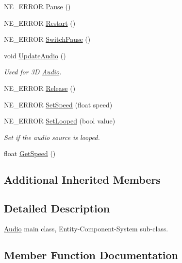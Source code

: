 \begin{DoxyCompactItemize}
N\+E\+\_\+\+E\+R\+R\+OR \mbox{\hyperlink{class_audio_a2f173c788f4c72def6cd0d5d52cb83a4}{Pause}} ()
\item 
N\+E\+\_\+\+E\+R\+R\+OR \mbox{\hyperlink{class_audio_ae2bcb6b054a71006cc8ac03ff62d5d96}{Restart}} ()
\item 
N\+E\+\_\+\+E\+R\+R\+OR \mbox{\hyperlink{class_audio_adf1cb46f65decf2c8101dd0461040953}{Switch\+Pause}} ()
\item 
\mbox{\label{class_audio_a4420fab7cb3ad15089d3f2b3ee74ccf3}} 
void \mbox{\hyperlink{class_audio_a4420fab7cb3ad15089d3f2b3ee74ccf3}{Update\+Audio}} ()
\begin{DoxyCompactList}\small\item\em Used for 3D \mbox{\hyperlink{class_audio}{Audio}}. \end{DoxyCompactList}\item 
N\+E\+\_\+\+E\+R\+R\+OR \mbox{\hyperlink{class_audio_a0adb187aa96b0c2115d69c70c83b2277}{Release}} ()
\item 
N\+E\+\_\+\+E\+R\+R\+OR \mbox{\hyperlink{class_audio_acf14619b8950e8c77494a8b19a9b2a89}{Set\+Speed}} (float speed)
\item 
N\+E\+\_\+\+E\+R\+R\+OR \mbox{\hyperlink{class_audio_a62ef89ef3f72dda0a2aece1784c26859}{Set\+Looped}} (bool value)
\begin{DoxyCompactList}\small\item\em Set if the audio source is looped. \end{DoxyCompactList}\item 
float \mbox{\hyperlink{class_audio_a8cc4f5f446bdea07680e91656f10d268}{Get\+Speed}} ()
\end{DoxyCompactItemize}
\subsection*{Additional Inherited Members}


\subsection{Detailed Description}
\mbox{\hyperlink{class_audio}{Audio}} main class, Entity-\/\+Component-\/\+System sub-\/class. 

\subsection{Member Function Documentation}
\mbox{\label{class_audio_a8cc4f5f446bdea07680e91656f10d268}} 
